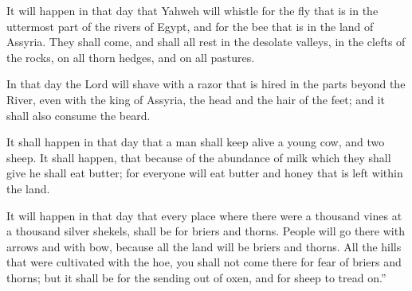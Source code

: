 {\par }{\PP {}It will happen in that day that Yahweh will whistle for the fly that is in the uttermost part of the rivers of Egypt, and for the bee that is in the land of Assyria.
They shall come, and shall all rest in the desolate valleys, in the clefts of the rocks, on all thorn hedges, and on all pastures.
\par }{\PP {}In that day the Lord will shave with a razor that is hired in the parts beyond the River, even with the king of Assyria, the head and the hair of the feet; and it shall also consume the beard.
\par }{\PP {}It shall happen in that day that a man shall keep alive a young cow, and two sheep.
It shall happen, that because of the abundance of milk which they shall give he shall eat butter; for everyone will eat butter and honey that is left within the land.
\par }{\PP {}It will happen in that day that every place where there were a thousand vines at a thousand silver shekels, shall be for briers and thorns.
People will go there with arrows and with bow, because all the land will be briers and thorns.
All the hills that were cultivated with the hoe, you shall not come there for fear of briers and thorns; but it shall be for the sending out of oxen, and for sheep to tread on.”

}
